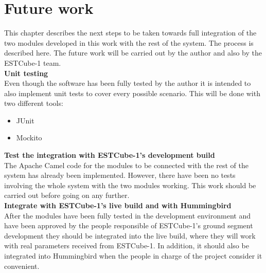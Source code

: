 \chapter{Future work}

This chapter describes the next steps to be taken towards full integration of the two modules developed in this work with the rest of the system. The process is described here. The future work will be carried out by the author and also by the ESTCube-1 team.\\


\textbf{Unit testing}\\
Even though the software has been fully tested by the author it is intended to also implement unit tests to cover every possible scenario. This will be done with two different tools:
\begin{itemize}
\item JUnit\cite{JUnit}
\item Mockito\cite{Mockito}
\end{itemize}
\vspace*{1\baselineskip}


\textbf{Test the integration with ESTCube-1's development build}\\
The Apache Camel code for the modules to be connected with the rest of the system has already been implemented. However, there have been no tests involving the whole system with the two modules working. This work should be carried out before going on any further.\\

\textbf{Integrate with ESTCube-1's live build and with Hummingbird}\\
After the modules have been fully tested in the development environment and have been approved by the people responsible of ESTCube-1's ground segment development they should be integrated into the live build, where they will work with real parameters received from ESTCube-1. In addition, it should also be integrated into Hummingbird when the people in charge of the project consider it convenient.\\




\newpage

